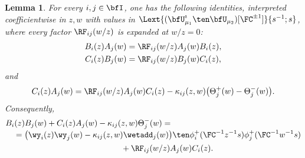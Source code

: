 \documentclass[reqno]{amsart}
\numberwithin{equation}{section}
\newtheorem*{lemma}{Lemma}
\begin{document}
\begin{lemma}
	For every $i,j\in\bfI$, one has the following identities, interpreted coefficientwise in $z,w$ with values in
		$\Lext{(\bfU^\imath_{\mu_1}\ten\bfU_{\mu_2})[\FC^{\pm1}]}{s^{-1};s}$,
		where every factor $\RF_{ij}(w/z)$ is expanded at $w/z=0$:
	\begin{align}
		B_i(z)A_j(w)&=\RF_{ij}(w/z)A_j(w)B_i(z),\label{app:BA}\\
		C_i(z)B_j(w)&=\RF_{ij}(w/z)B_j(w)C_i(z),\label{app:CB}
	\end{align}
	and
	\begin{equation}
		C_i(z)A_j(w)=\RF_{ij}(w/z)A_j(w)C_i(z)
		-\kappa_{ij}(z,w)\bigl(\Theta_j^+(w)-\Theta_j^-(w)\bigr).
		\label{app:CA}
	\end{equation}
	Consequently,
	\begin{equation}
		\begin{aligned}
			&B_i(z)B_j(w)+C_i(z)A_j(w)-\kappa_{ij}(z,w)\Theta_j^-(w)=\\[-1mm]
			&\quad=\bigl(\wy_i(z)\wy_j(w)-\kappa_{ij}(z,w)\wetadd_j(w)\bigr)\ten \phi_i^+({\FC^{-1}z^{-1}} s)\phi_j^+({\FC^{-1}w^{-1}} s)\\
			&\hspace{5cm}
			+\RF_{ij}(w/z)A_j(w)C_i(z).
		\end{aligned}
		\label{app:local-cancellation}
	\end{equation}
\end{lemma}
\end{document}
